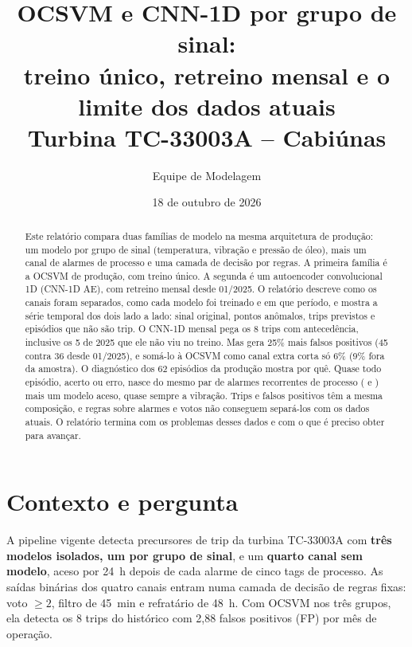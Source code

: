 \documentclass[11pt,a4paper]{article}
\title{OCSVM e CNN-1D por grupo de sinal:\\ treino único, retreino mensal e o limite dos dados atuais\\
\large Turbina TC-33003A -- Cabiúnas}
\author{Equipe de Modelagem}
\date{18 de outubro de 2026}
\newcommand{\tg}[1]{\texttt{\detokenize{#1}}}
\begin{document}
\maketitle

\begin{abstract}
Este relatório compara duas famílias de modelo na mesma arquitetura de produção: um modelo por grupo de sinal
(temperatura, vibração e pressão de óleo), mais um canal de alarmes de processo e uma camada de decisão por regras.
A primeira família é a OCSVM de produção, com treino único. A segunda é um autoencoder convolucional 1D (CNN-1D AE),
com retreino mensal desde 01/2025. O relatório descreve como os canais foram separados, como cada modelo foi treinado
e em que período, e mostra a série temporal dos dois lado a lado: sinal original, pontos anômalos, trips previstos e
episódios que não são trip. O CNN-1D mensal pega os 8 trips com antecedência, inclusive os 5 de 2025 que ele não viu
no treino. Mas gera 25\% mais falsos positivos (45 contra 36 desde 01/2025), e somá-lo à OCSVM como canal extra corta
só 6\% (9\% fora da amostra). O diagnóstico dos 62 episódios da produção mostra por quê. Quase todo episódio, acerto ou erro, nasce do
mesmo par de alarmes recorrentes de processo (\tg{PI_6240319_AL} e \tg{PAL_6240315}) mais um modelo aceso, quase
sempre a vibração. Trips e falsos positivos têm a mesma composição, e regras sobre alarmes e votos não conseguem
separá-los com os dados atuais. O relatório termina com os problemas desses dados e com o que é preciso obter para
avançar.
\end{abstract}

\tableofcontents
\newpage

\section{Contexto e pergunta}

A pipeline vigente detecta precursores de trip da turbina TC-33003A com \textbf{três modelos isolados, um por grupo
de sinal}, e um \textbf{quarto canal sem modelo}, aceso por 24~h depois de cada alarme de cinco tags de processo. As
saídas binárias dos quatro canais entram numa camada de decisão de regras fixas: voto $\geq 2$, filtro de 45~min e
refratário de 48~h. Com OCSVM nos três grupos, ela detecta os 8 trips do histórico com 2,88 falsos positivos (FP)
por mês de operação.
\end{document}
